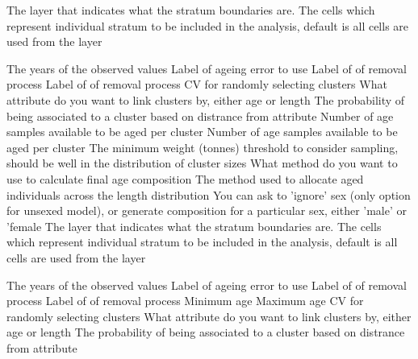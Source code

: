  {The layer that indicates what the stratum boundaries are.}
 {The cells which represent individual stratum to be included in the analysis, default is all cells are used from the layer}
\par\textbf{}\par
{} {The years of the observed values}
 {Label of ageing error to use}
 {Label of of removal process}
 {Label of of removal process}
 {CV for randomly selecting clusters}
 {What attribute do you want to link clusters by, either age or length}
 {The probability of being associated to a cluster based on distrance from attribute}
 {Number of age samples available to be aged per cluster}
 {Number of age samples available to be aged per cluster}
 {The minimum weight (tonnes) threshold to consider sampling, should be well in the distribution of cluster sizes}
 {What method do you want to use to calculate final age composition}
 {The method used to allocate aged individuals across the length distribution}
 {You can ask to 'ignore' sex (only option for unsexed model), or generate composition for a particular sex, either 'male' or 'female}
 {The layer that indicates what the stratum boundaries are.}
 {The cells which represent individual stratum to be included in the analysis, default is all cells are used from the layer}
\par\textbf{}\par
{} {The years of the observed values}
 {Label of ageing error to use}
 {Label of of removal process}
 {Label of of removal process}
 {Minimum age}
 {Maximum age}
 {CV for randomly selecting clusters}
 {What attribute do you want to link clusters by, either age or length}
 {The probability of being associated to a cluster based on distrance from attribute}
